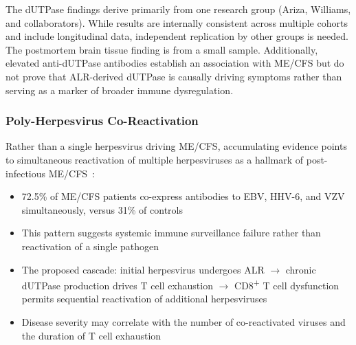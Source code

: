 \begin{limitation}
The dUTPase findings derive primarily from one research group (Ariza, Williams, and collaborators). While results are internally consistent across multiple cohorts and include longitudinal data, independent replication by other groups is needed. The postmortem brain tissue finding is from a small sample. Additionally, elevated anti-dUTPase antibodies establish an association with ME/CFS but do not prove that ALR-derived dUTPase is causally driving symptoms rather than serving as a marker of broader immune dysregulation.
\end{limitation}

\subsubsection{Poly-Herpesvirus Co-Reactivation}
\label{sec:poly-herpesvirus}

Rather than a single herpesvirus driving ME/CFS, accumulating evidence points to simultaneous reactivation of multiple herpesviruses as a hallmark of post-infectious ME/CFS~\cite{Ariza2025polyherpesvirus, Palomo2026herpesvirus}:
\begin{itemize}
    \item 72.5\% of ME/CFS patients co-express antibodies to EBV, HHV-6, and VZV simultaneously, versus 31\% of controls~\cite{Palomo2026herpesvirus}
    \item This pattern suggests systemic immune surveillance failure rather than reactivation of a single pathogen
    \item The proposed cascade: initial herpesvirus undergoes ALR $\rightarrow$ chronic dUTPase production drives T cell exhaustion $\rightarrow$ CD8\textsuperscript{+} T cell dysfunction permits sequential reactivation of additional herpesviruses
    \item Disease severity may correlate with the number of co-reactivated viruses and the duration of T cell exhaustion
\end{itemize}

